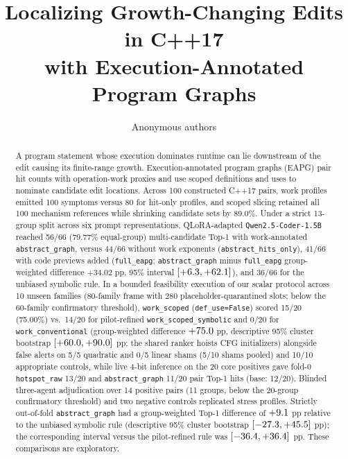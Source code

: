 \documentclass[10pt,journal]{IEEEtran}
\title{Localizing Growth-Changing Edits in C++17\\
with Execution-Annotated Program Graphs}
\author{Anonymous authors}
\begin{document}
\maketitle

\begin{abstract}
A program statement whose execution dominates runtime can lie downstream of the edit causing its finite-range growth. Execution-annotated program graphs (EAPG) pair hit counts with operation-work proxies and use scoped definitions and uses to nominate candidate edit locations. Across 100 constructed C++17 pairs, work profiles emitted 100 symptoms versus 80 for hit-only profiles, and scoped slicing retained all 100 mechanism references while shrinking candidate sets by 89.0\%. Under a strict 13-group split across six prompt representations, QLoRA-adapted \texttt{Qwen2.5-Coder-1.5B} reached 56/66 (79.77\% equal-group) multi-candidate Top-1 with work-annotated \nolinkurl{abstract_graph}, versus 44/66 without work exponents (\nolinkurl{abstract_hits_only}), 41/66 with code previews added (\nolinkurl{full_eapg}; \nolinkurl{abstract_graph} minus \nolinkurl{full_eapg} group-weighted difference $+34.02$ pp, 95\% interval $[+6.3, +62.1]$), and 36/66 for the unbiased symbolic rule. In a bounded feasibility execution of our scalar protocol across 10 unseen families (80-family frame with 280 placeholder-quarantined slots; below the 60-family confirmatory threshold), \texttt{work\_scoped} (\nolinkurl{def_use=False}) scored 15/20 (75.00\%) vs.\ 14/20 for pilot-refined \nolinkurl{work_scoped_symbolic} and 0/20 for \texttt{work\_conventional} (group-weighted difference $+75.0$ pp, descriptive 95\% cluster bootstrap $[+60.0, +90.0]$ pp; the shared ranker hoists CFG initializers) alongside false alerts on 5/5 quadratic and 0/5 linear shams (5/10 shams pooled) and 10/10 appropriate controls, while live 4-bit inference on the 20 core positives gave fold-0 \nolinkurl{hotspot_raw} 13/20 and \nolinkurl{abstract_graph} 11/20 pair Top-1 hits (base: 12/20). Blinded three-agent adjudication over 14 positive pairs (11 groups, below the 20-group confirmatory threshold) and two negative controls replicated stress profiles. Strictly out-of-fold \nolinkurl{abstract_graph} had a group-weighted Top-1 difference of $+9.1$ pp relative to the unbiased symbolic rule (descriptive 95\% cluster bootstrap $[-27.3, +45.5]$ pp); the corresponding interval versus the pilot-refined rule was $[-36.4, +36.4]$ pp. These comparisons are exploratory.
\end{abstract}
\end{document}
